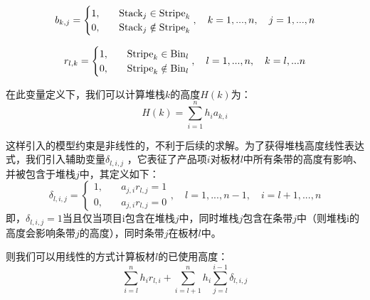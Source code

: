 \documentclass[bwprint]{gmcmthesis}
\begin{document}
\begin{equation}
    b_{k,j}=
    \begin{cases}
        1, \quad  &  {\rm Stack}_j \in   {\rm Stripe}_k \\
        0,\quad  &  {\rm Stack}_j  \notin   {\rm Stripe}_k \\
    \end{cases},\quad k=1,...,n, \quad j=1,...,n \label{决策变量定义b}
\end{equation}

\begin{equation}
    r_{l,k}=
    \begin{cases}
        1, \quad  &  {\rm Stripe}_k \in   {\rm Bin}_l \\
        0,\quad  &  {\rm Stripe}_k  \notin   {\rm Bin}_l \\
    \end{cases},\quad l=1,...,n, \quad k=l,...n \label{决策变量定义r}
\end{equation}

在此变量定义下，我们可以计算堆栈$k$的高度$H(k)$为：
\begin{equation}
    H(k)=\sum_{i=1}^{n} h_i a_{k,i}
\end{equation}


这样引入的模型约束是非线性的，不利于后续的求解。为了获得堆栈高度线性表达式，我们引入辅助变量$\delta_{l,i,j}$ ，它表征了产品项$i$对板材$l$中所有条带的高度有影响、并被包含于堆栈$j$中，其定义如下：
\begin{equation}
    \delta_{l,i,j}=  
    \begin{cases}
        1, \quad  & a_{j,i} r_{l,j}=1\\
        0, \quad  & a_{j,i} r_{l,j}=0
    \end{cases},\quad l=1,...,n-1, \quad i=l+1,...,n
\end{equation}
即，$\delta_{l,i,j} = 1$当且仅当项目i包含在堆栈$j$中，同时堆栈$j$包含在条带$j$中（则堆栈i的高度会影响条带$j$的高度），同时条带$j$在板材$l$中。

则我们可以用线性的方式计算板材$l$的已使用高度：
\begin{equation}
\sum_{i=l}^{n} h_i r_{l,i}+\sum_{i=l+1}^{n} h_i \sum_{j=l}^{i-1} \delta_{l,i,j}
\end{equation}
\end{document}
